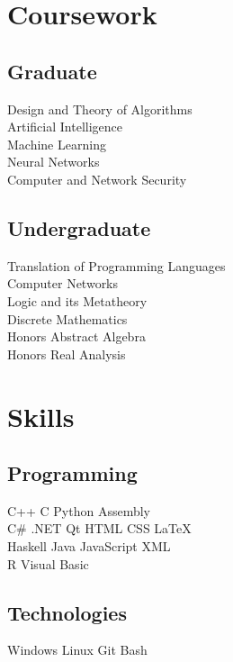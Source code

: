 \documentclass[]{deedy-resume-openfont}
\begin{document}
\begin{minipage}[t]{0.33\textwidth}
\section{Coursework}
\subsection{Graduate}
Design and Theory of Algorithms\\
Artificial Intelligence\\
Machine Learning\\
Neural Networks\\
Computer and Network Security\\
\sectionsep

\subsection{Undergraduate}
Translation of Programming Languages\\
Computer Networks\\
Logic and its Metatheory\\
Discrete Mathematics\\
Honors Abstract Algebra\\
Honors Real Analysis\\
\sectionsep


\section{Skills}
\subsection{Programming}
C++ \textbullet{} C \textbullet{} Python \textbullet{} Assembly\\
C\# \textbullet{} .NET \textbullet{} Qt \textbullet{} HTML \textbullet{} CSS \textbullet{} \LaTeX\\
Haskell \textbullet{} Java \textbullet{} JavaScript \textbullet{} XML\\
R \textbullet{} Visual Basic
\sectionsep
\subsection{Technologies}
Windows \textbullet{} Linux \textbullet{} Git \textbullet{} Bash

%
%

\end{minipage} 
\end{document}
